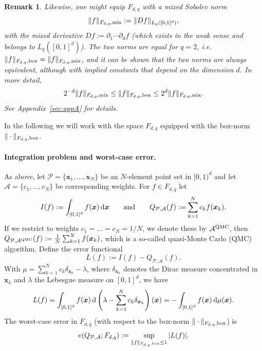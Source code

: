 \documentclass[12pt]{article}
\newtheorem{remark}{Remark}
\theoremstyle{remark}
\theoremstyle{definition}
\newcommand{\bx}{{\rm box}}
\newcommand{\mx}{{\rm mix}}
\newcommand{\qmc}{{\rm QMC}}
\newcommand{\rd}{\,{\rm d}}
\newcommand{\bsx}{{\boldsymbol x}}
\newcommand{\cP}{\mathcal{P}}
\newcommand{\cA}{\mathcal{A}}
\newcommand{\<}{\langle}
\renewcommand{\>}{\rangle}
\begin{document}
\begin{remark}\label{remark3}\rm
Likewise, one might equip $F_{d,q}$ with a mixed Sobolev norm  
\[
\|f\|_{F_{d,q},\mx} := \| D f\|_{L_q([0,1]^d)},
\]
with the mixed derivative $D f:=\partial_1\cdots\partial_d f$ (which exists in the weak sense and belongs to $L_q([0,1]^d)$).
The two norms are equal for $q=2$, i.e. $\| f \|_{F_{d,q},\bx} = \|f\|_{F_{d,q},\mx}$, and it can be shown that the two norms are always equivalent, although with implied constants that depend 
on the dimension $d$. In more detail, 
\begin{equation}\label{norm:equiv}
2^{-d} \|f\|_{F_{d,q},\mx} \le \|f\|_{F_{d,q},\bx} \le 2^d  \|f\|_{F_{d,q},\mx}.
\end{equation}
See  Appendix~\ref{sec:appA} for details.
\end{remark}

In the following we will work with the space $F_{d,q}$ equipped with the box-norm $\|\cdot\|_{F_{d,q},\bx}$.

\paragraph{Integration problem and worst-case error.}

As above, let $\cP=\{\bsx_1,\ldots,\bsx_N\}$ be an $N$-element point set in $[0,1)^d$ and 
let $\cA=\{c_1,\ldots,c_N\}$ be corresponding weights. For $f \in F_{d,q}$ let
\begin{equation}\label{def:I:Q}
I(f):=\int_{[0,1]^d} f(\bsx)\rd \bsx
\qquad \mbox{and}\qquad
Q_{\cP,\cA}(f):=\sum_{k=1}^N c_k f(\bsx_k).
\end{equation}
If we restrict to weights $c_1=\ldots =c_N=1/N$, we denote these by $\cA^{\qmc}$, 
then $Q_{\cP,\cA^{\qmc}}(f):=\frac{1}{N}\sum_{k=1}^N f(\bsx_k)$, which is a so-called quasi-Monte Carlo (QMC) algorithm. 
Define the error functional
\[
L(f):=I(f)-Q_{\cP,\cA}(f).
\]
With $\mu=\sum_{k=1}^N c_k\delta_{\bsx_k}-\lambda$,  where $\delta_{\bsx_k}$ denotes the Dirac measure concentrated in $\bsx_k$ and $\lambda$ the Lebesgue measure on $[0,1]^d$,  we have
\begin{equation}\label{eq:L-mu}
L(f)=\int_{[0,1]^d} f(\bsx) \rd\left(\lambda-\sum_{k=1}^N c_k\delta_{\bsx_k}\right)(\bsx)
= -\int_{[0,1]^d} f(\bsx) \rd\mu(\bsx).
\end{equation}
The worst-case error in $F_{d,q}$ (with respect to the box-norm $\|\cdot\|_{F_{d,q},\bx}$) is
\[
e(Q_{\cP,\cA};F_{d,q}) := \sup_{\|f\|_{F_{d,q},\bx}\le 1}|L(f)|.
\]
\end{document}
